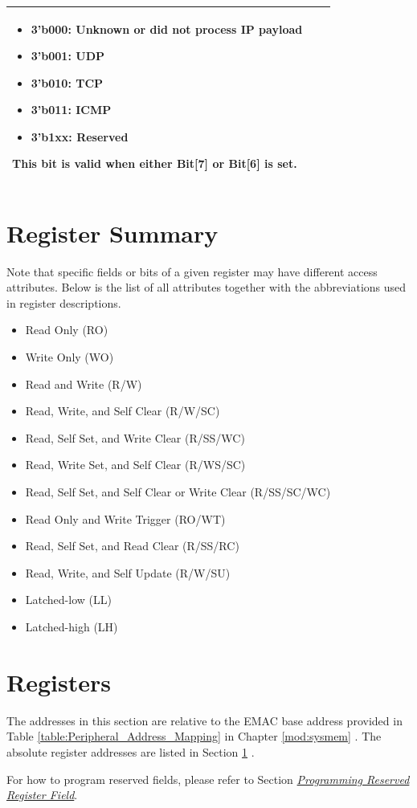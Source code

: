 \documentclass[main\_\_EN.tex]{subfiles}
\begin{document}
\begin{longtable}[c]{ |p{1cm}|p{4cm}|p{10cm}| }
\begin{itemize}
\item 3'b000: Unknown or did not process IP payload
\item 3'b001: UDP
\item 3'b010: TCP
\item 3'b011: ICMP
\item 3’b1xx: Reserved
\end{itemize}
This bit is valid when either Bit[7] or Bit[6] is set.\\\hline
\end{longtable}

\hypertarget{ethernetmac-reg-summ}{}
\section{Register Summary}
\label{section:Ethernet Mac Register Summary}

Note that specific fields or bits of a given register may have different access attributes. Below is the list of all attributes together with the abbreviations used in register descriptions.

\begin{itemize}
    \item Read Only (RO)
    \item Write Only (WO)
    \item Read and Write (R/W)
    \item Read, Write, and Self Clear (R/W/SC)
    \item Read, Self Set, and Write Clear (R/SS/WC)
    \item Read, Write Set, and Self Clear (R/WS/SC)
    \item Read, Self Set, and Self Clear or Write Clear (R/SS/SC/WC)
    \item Read Only and Write Trigger (RO/WT)
    \item Read, Self Set, and Read Clear (R/SS/RC)
    \item Read, Write, and Self Update (R/W/SU)
    \item Latched-low (LL)
    \item Latched-high (LH)
\end{itemize}



\section{Registers}\label{ethernetreg}

The addresses in this section are relative to the EMAC base address provided in Table \ref{table:Peripheral_Address_Mapping} in Chapter \ref{mod:sysmem} \textit{}. The absolute register addresses are listed in Section \ref{section:Ethernet Mac Register Summary} \textit{}. 

For how to program reserved fields, please refer to Section \hyperref[programming-reserved-field]{\textit{Programming Reserved Register Field}}.


\end{document}
